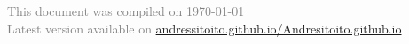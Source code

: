 \documentclass{resume} %
\begin{document}






\begin{flushright}
     \textcolor{gray}{This document was compiled on \today\\ Latest version available on \href{https://andressitoito.github.io/Andresitoito.github.io/}{andressitoito.github.io/Andresitoito.github.io}}
\end{flushright} 
\end{document}
